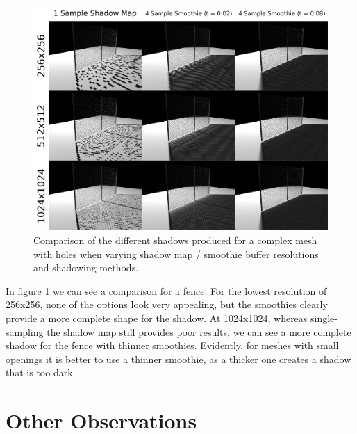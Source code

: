 \documentclass[sigconf]{acmart}
\begin{document}
\begin{figure}[t]
    \includegraphics[width=\linewidth]{reportfiles/complex-visuals}
    \caption{Comparison of the different shadows produced for a complex mesh with holes when varying shadow map / smoothie buffer resolutions and shadowing methods.}
    \label{fig:complex-visuals}
\end{figure}

In figure \ref{fig:complex-visuals} we can see a comparison for a fence. For the lowest resolution of 256x256, none of the options look very appealing, but the smoothies clearly provide a more complete shape for the shadow. At 1024x1024, whereas single-sampling the shadow map still provides poor results, we can see a more complete shadow for the fence with thinner smoothies. Evidently, for meshes with small openings it is better to use a thinner smoothie, as a thicker one creates a shadow that is too dark.

\section{Other Observations}
\end{document}

